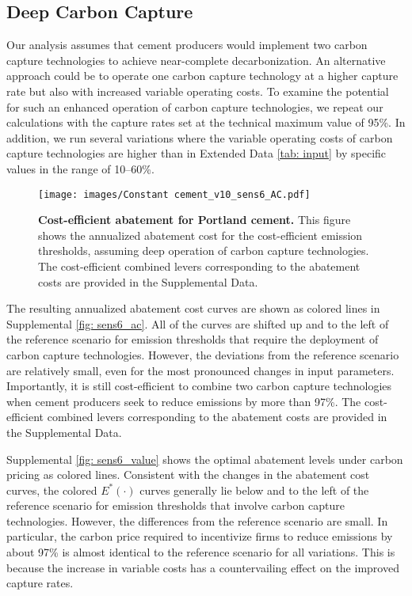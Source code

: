 \documentclass[12pt, a4paper]{article} %
\newcommand{\Suppl}{Supplemental}
\begin{document}
\subsection{Deep Carbon Capture}
\label{sec: sn-deep-ccs}

Our analysis assumes that cement producers would implement two carbon capture technologies to achieve near-complete decarbonization. An alternative approach could be to operate one carbon capture technology at a higher capture rate but also with increased variable operating costs. %
To examine the potential for such an enhanced operation of carbon capture technologies, we repeat our calculations with the capture rates set at the technical maximum value of 95\%. In addition, we run several variations where the variable operating costs of carbon capture technologies are higher than in Extended Data \autoref{tab: input} by specific values in the range of 10--60\%.

\begin{figure}[ht]
\centering
\texttt{[image: images/Constant cement\_v10\_sens6\_AC.pdf]}
\caption{\textbf{Cost-efficient abatement for Portland cement.} This figure shows the annualized abatement cost for the cost-efficient emission thresholds, assuming deep operation of carbon capture technologies. The cost-efficient combined levers corresponding to the abatement costs are provided in the \Suppl$ $ Data.}
\label{fig: sens6_ac}
\end{figure}

The resulting annualized abatement cost curves are shown as colored lines in \Suppl$ $ \autoref{fig: sens6_ac}. All of the curves are shifted up and to the left of the reference scenario for emission thresholds that require the deployment of carbon capture technologies. However, the deviations from the reference scenario are relatively small, even for the most pronounced changes in input parameters. Importantly, it is still cost-efficient to combine two carbon capture technologies when cement producers seek to reduce emissions by more than 97\%. The cost-efficient combined levers corresponding to the abatement costs are provided in the \Suppl$ $ Data.

\Suppl$ $ \autoref{fig: sens6_value} shows the optimal abatement levels under carbon pricing as colored lines. Consistent with the changes in the abatement cost curves, the colored $E^*(\cdot)$ curves generally lie below and to the left of the reference scenario for emission thresholds that involve carbon capture technologies. However, the differences from the reference scenario are small. In particular, the carbon price required to incentivize firms to reduce emissions by about 97\% is almost identical to the reference scenario for all variations. This is because the increase in variable costs has a countervailing effect on the improved capture rates.
\end{document}
